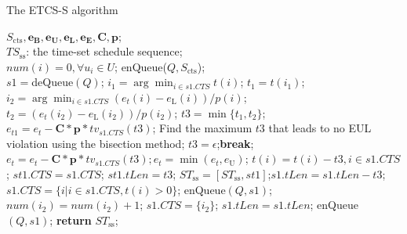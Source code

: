 \documentclass[12pt,journal,onecolumn,draftcls]{IEEEtran}
\begin{document}
\begin{algorithm}[!htb]
\caption{The ETCS-S algorithm}
\begin{algorithmic}[1]\label{Alg_ETCS_S}
    \REQUIRE $S_\text{cts},\mathbf{e_B}, \mathbf{e_U}, \mathbf{e_L}, \mathbf{e_E}, \mathbf{C}, \mathbf{p}$;\\
    \ENSURE $TS_\text{ss}$: the time-set schedule sequence;\\
    \STATE $num(i)=0, {\forall}u_i{\in}U$; enQueue($Q,S_\text{cts}$); \\
        \STATE $s1{=}$deQueue$(Q)$;
        \STATE $i_1{=}\arg \min_{i{\in}s1.CTS}t(i)$; $t_1{=}t(i_1)$; \label{line_timelen_time}
        \STATE $i_2{=}\arg \min_{i{\in}s1.CTS}(e_t(i){-}e_\text{L}(i))/p(i)$; $t_2{=}(e_t(i_2){-}e_\text{L}(i_2))/p(i_2)$; \label{line_timelen_emin}
            \STATE $t3{=}\min\{t_1,t_2\}$;
            \STATE $e_{t1}{=}e_t{-}\mathbf{C}{*}\mathbf{p}{*}tv_{s1.CTS}(t3)$;
                \STATE Find the maximum $t3$ that leads to no EUL violation using the bisection method;\label{line_timelen_emax}
                    \STATE $t3{=}\epsilon$;\textbf{break};\label{slicelen2epsilon}
                \ENDIF
            \ENDWHILE
            \STATE $e_{t}{=}e_t{-}\mathbf{C}{*}\mathbf{p}{*}tv_{s1.CTS}(t3); e_{t}{=}\min{(e_{t},e_\text{U})}$;
            \STATE $t(i){=}t(i){-}t3, i{\in}s1.CTS$;
            \STATE $st1.CTS{=}s1.CTS$; $st1.tLen{=}t3$;
            \STATE $ST_\text{ss}{=}[ST_\text{ss},st1]$;$s1.tLen{=}s1.tLen{-}t3$;
            \STATE $s1.CTS{=}\{i|i{\in}s1.CTS, t(i){>}0\}$;
                \STATE enQueue$(Q,s1)$;
            \ENDIF
        \ELSE
            \STATE $num(i_2){=}num(i_2){+}1$;
                \STATE $s1.CTS{=}\{i_2\}$; $s1.tLen{=}s1.tLen$;
                \STATE enQueue$(Q,s1)$;
            \ENDIF
        \ENDIF
     \ENDWHILE
     \STATE \textbf{return} $ST_\text{ss}$;
\end{algorithmic}
\end{algorithm}
\end{document}
